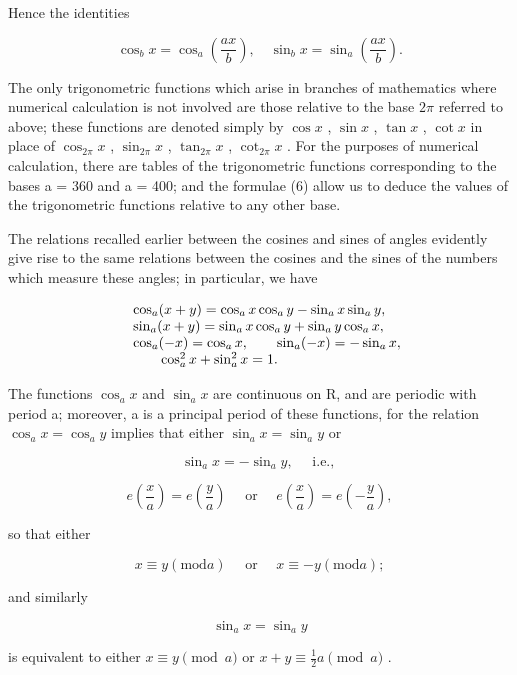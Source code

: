Hence the identities

\[
\cos_ {b} x = \cos_ {a} \left(\frac {a x}{b}\right), \quad \sin_ {b} x = \sin_ {a} \left(\frac {a x}{b}\right).\tag{6}
\]

The only trigonometric functions which arise in branches of mathematics where numerical calculation is not involved are those relative to the base \(2\pi\) referred to above; these functions are denoted simply by \(\cos x\) , \(\sin x\) , \(\tan x\) , \(\cot x\) in place of \(\cos_{2\pi}x\) , \(\sin_{2\pi}x\) , \(\tan_{2\pi}x\) , \(\cot_{2\pi}x\) . For the purposes of numerical calculation, there are tables of the trigonometric functions corresponding to the bases a = 360 and a = 400; and the formulae (6) allow us to deduce the values of the trigonometric functions relative to any other base.

The relations recalled earlier between the cosines and sines of angles evidently give rise to the same relations between the cosines and the sines of the numbers which measure these angles; in particular, we have

\[
\begin{array}{r l} & {\cos_ {a} (x + y) = \cos_ {a} x \cos_ {a} y - \sin_ {a} x \sin_ {a} y,} \\ & {\sin_ {a} (x + y) = \sin_ {a} x \cos_ {a} y + \sin_ {a} y \cos_ {a} x,} \\ & {\cos_ {a} (- x) = \cos_ {a} x, \qquad \sin_ {a} (- x) = - \sin_ {a} x,} \\ & {\qquad \cos_ {a} ^ {2} x + \sin_ {a} ^ {2} x = 1.} \end{array}
\]

The functions \(\cos_{a}x\) and \(\sin_{a}x\) are continuous on R, and are periodic with period a; moreover, a is a principal period of these functions, for the relation \(\cos_{a}x = \cos_{a}y\) implies that either \(\sin_{a}x = \sin_{a}y\) or

\[
\sin_ {a} x = - \sin_ {a} y, \quad \text { i.e., }
\]

\[
e \left(\frac {x}{a}\right) = e \left(\frac {y}{a}\right) \quad \text { or } \quad e \left(\frac {x}{a}\right) = e \left(- \frac {y}{a}\right),
\]

so that either

\[
x \equiv y (\mathrm{mod} a) \quad \text { or } \quad x \equiv - y (\mathrm{mod} a);
\]

and similarly

\[
\sin_ {a} x = \sin_ {a} y
\]

is equivalent to either \(x \equiv y \pmod{a}\) or \(x + y \equiv \frac{1}{2} a \pmod{a}\) .

